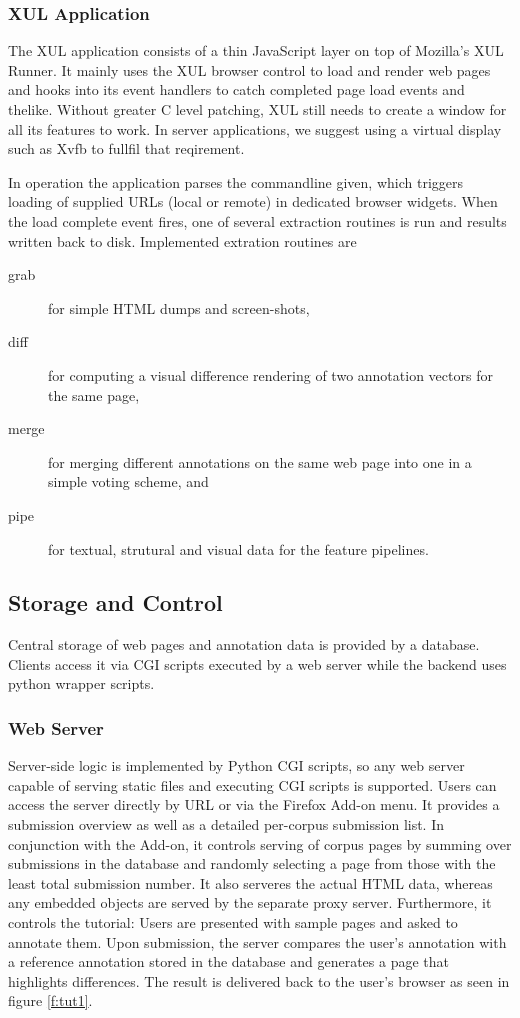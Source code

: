 \subsubsection{XUL Application \label{app}}

The XUL application consists of a thin JavaScript layer on top of Mozilla's XUL Runner.
It mainly uses the XUL browser control to load and render web pages and hooks into its event handlers to catch completed page load events and thelike.
Without greater C level patching, XUL still needs to create a window for all its features to work.
In server applications, we suggest using a virtual display such as Xvfb to fullfil that reqirement.

In operation the application parses the commandline given, which triggers loading of supplied URLs (local or remote) in dedicated browser widgets.
When the load complete event fires, one of several extraction routines is run and results written back to disk.
Implemented extration routines are 
\begin{description}
\item[grab] for simple HTML dumps and screen-shots,
\item[diff] for computing a visual difference rendering of two annotation vectors for the same page,
\item[merge] for merging different annotations on the same web page into one in a simple voting scheme, and
\item[pipe] for textual, strutural and visual data for the feature pipelines.
\end{description}

\subsection{Storage and Control\label{server}}

Central storage of web pages and annotation data is provided by a database.
Clients access it via CGI scripts executed by a web server while the backend uses python wrapper scripts.

\subsubsection{Web Server\label{webs}}

Server-side logic is implemented by Python CGI scripts, so any web server capable of serving static files and executing CGI scripts is supported.
Users can access the server directly by URL or via the Firefox Add-on menu.
It provides a submission overview as well as a detailed per-corpus submission list.
In conjunction with the Add-on, it controls serving of corpus pages by summing over submissions in the database and randomly selecting a page from those with the least total submission number.
It also serveres the actual HTML data, whereas any embedded objects are served by the separate proxy server.
Furthermore, it controls the tutorial: Users are presented with sample pages and asked to annotate them.
Upon submission, the server compares the user's annotation with a reference annotation stored in the database and generates a page that highlights differences.
The result is delivered back to the user's browser as seen in figure \ref{f:tut1}.

